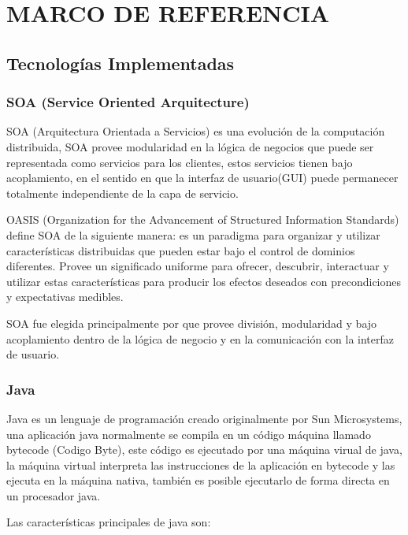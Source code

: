 \section{MARCO DE REFERENCIA}

\subsection{Tecnologías Implementadas}

\subsubsection*{SOA (Service Oriented Arquitecture)}

SOA (Arquitectura Orientada a Servicios) es una evolución de la computación distribuida, SOA provee modularidad en la lógica de negocios que puede ser representada como servicios para los clientes, estos servicios tienen bajo acoplamiento, en el sentido en que la interfaz de usuario(GUI) puede permanecer totalmente independiente de la capa de servicio.

OASIS (Organization for the Advancement of Structured Information Standards) define SOA de la siguiente manera: es un paradigma para organizar y utilizar características distribuidas que pueden estar bajo el control de dominios diferentes. Provee un significado uniforme para ofrecer, descubrir, interactuar y utilizar estas características para producir los efectos deseados con precondiciones y expectativas medibles.

SOA fue elegida principalmente por que provee división, modularidad y bajo acoplamiento dentro de la lógica de negocio y en la comunicación con la interfaz de usuario.


\subsubsection*{Java \cite{java} }

Java es un lenguaje de programación creado originalmente por Sun Microsystems, una aplicación java normalmente se compila en un código máquina llamado bytecode (Codigo Byte), este código es ejecutado por una máquina virual de java, la máquina virtual interpreta las instrucciones de la aplicación en bytecode y las ejecuta en la máquina nativa, también es posible ejecutarlo de forma directa en un procesador java.

Las características \cite{java_caracteristicas} principales de java son:

